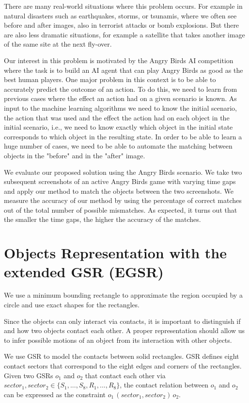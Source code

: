 \documentclass[letterpaper]{article}
\begin{document}
There are many real-world situations where this problem occurs. For example in natural disasters such as earthquakes, storms, or tsunamis, where we often see before and after images, also in terrorist attacks or bomb explosions. But there are also less dramatic situations, for example a satellite that takes another image of the same site at the next fly-over.

Our interest in this problem is motivated by the Angry Birds AI competition where the task is to build an AI agent that can play Angry Birds as good as the best human players. One major problem in this context is to be able to accurately predict the outcome of an action. To do this, we need to learn from previous cases where the effect an action had on a given scenario is known. As input to the machine learning algorithms we need to know the initial scenario, the action that was used and the effect the action had on each object in the initial scenario, i.e., we need to know exactly which object in the initial state corresponds to which object in the resulting state. In order to be able to learn a huge number of cases, we need to be able to automate the matching between objects in the "before" and in the "after" image.

We evaluate our proposed solution using the Angry Birds scenario. We take two subsequent screenshots of an active Angry Birds game with varying time gaps and apply our method to match the objects between the two screenshots. We measure the accuracy of our method by using the percentage of correct matches out of the total number of possible mismatches. As expected, it turns out that the smaller the time gaps, the higher the accuracy of the matches.

 
\section{Objects Representation with the extended GSR (EGSR)}

We use a minimum bounding rectangle to approximate the region occupied by a circle and use exact shapes for the rectangles.

Since the objects can only interact via contacts, it is important to distinguish if and how two objects contact each other. A proper representation should allow us to infer possible motions of an object from its interaction with other objects. 

We use GSR\cite{} to model the contacts between solid rectangles. GSR defines eight contact sectors that correspond to the eight edges and corners of the rectangles. Given two GSRs $o_1$ and $o_2$ that contact each other via $sector_1, sector_2 \in \{S_1, ..., S_8, R_1, ..., R_8\}$, the contact relation between $o_1$ and $o_2$ can be expressed as the constraint $o_1 \, (sector_1, sector_2) \, o_2$. 
\end{document}
